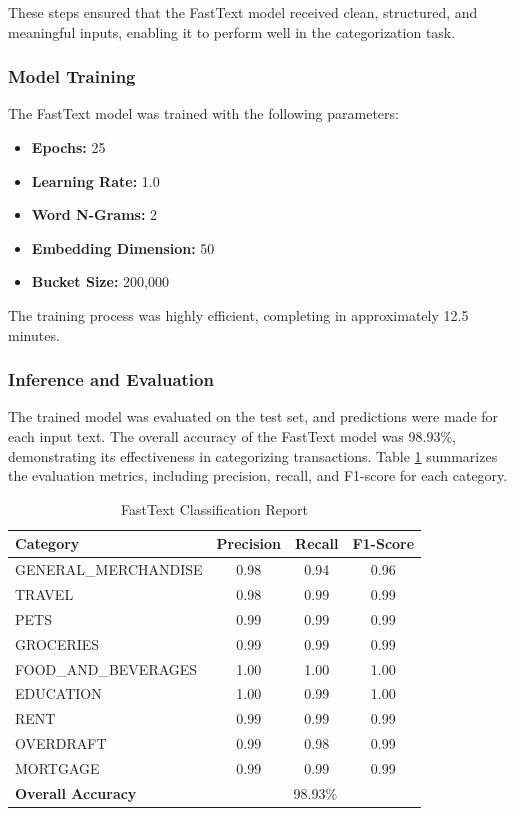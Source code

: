 \documentclass[12pt,letterpaper]{article}
\begin{document}
These steps ensured that the FastText model received clean, structured, and meaningful inputs, enabling it to perform well in the categorization task.

\subsubsection{Model Training}
The FastText model was trained with the following parameters:
\begin{itemize}
    \item \textbf{Epochs:} 25
    \item \textbf{Learning Rate:} 1.0
    \item \textbf{Word N-Grams:} 2
    \item \textbf{Embedding Dimension:} 50
    \item \textbf{Bucket Size:} 200,000
\end{itemize}
The training process was highly efficient, completing in approximately 12.5 minutes.

\subsubsection{Inference and Evaluation}
The trained model was evaluated on the test set, and predictions were made for each input text. The overall accuracy of the FastText model was 98.93\%, demonstrating its effectiveness in categorizing transactions. Table \ref{table:fasttext_classification_report} summarizes the evaluation metrics, including precision, recall, and F1-score for each category.

\begin{table}[H]
    \centering
    \begin{tabular}{lccc}
        \hline
        \textbf{Category} & \textbf{Precision} & \textbf{Recall} & \textbf{F1-Score} \\
        \hline
        GENERAL\_MERCHANDISE & 0.98 & 0.94 & 0.96 \\
        TRAVEL & 0.98 & 0.99 & 0.99 \\
        PETS & 0.99 & 0.99 & 0.99 \\
        GROCERIES & 0.99 & 0.99 & 0.99 \\
        FOOD\_AND\_BEVERAGES & 1.00 & 1.00 & 1.00 \\
        EDUCATION & 1.00 & 0.99 & 1.00 \\
        RENT & 0.99 & 0.99 & 0.99 \\
        OVERDRAFT & 0.99 & 0.98 & 0.99 \\
        MORTGAGE & 0.99 & 0.99 & 0.99 \\
        \hline
        \textbf{Overall Accuracy} & \multicolumn{3}{c}{98.93\%} \\
        \hline
    \end{tabular}
    \caption{FastText Classification Report}
    \label{table:fasttext_classification_report}
\end{table}
\end{document}
